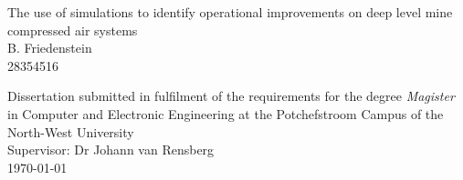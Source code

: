 \documentclass[11.5pt, english, oneside, singlespacing, open=any]{report}
\begin{document}
	
\begin{titlepage}
	\BgThispage	
		\vspace{0cm}
		\begin{center}
			\Huge{The use of simulations to identify operational improvements on deep level mine compressed air systems}\\
			\vspace{4cm}
			\huge{B. Friedenstein \\28354516}\\
		\end{center}
	
	\vspace{2cm}
	
\begin{flushleft}
	{\centering \LARGE Dissertation submitted in fulfilment of the requirements for the degree {\color{blue} \textit{Magister}} in {\color{blue}Computer and Electronic Engineering} at the Potchefstroom Campus of the North-West University\\
	}
	\vspace{3cm}
	{\LARGE \setlength{\parindent}{0.5cm} Supervisor: Dr Johann van Rensberg \\
	\vspace{3cm}
	\LARGE{\monthyeardate\today}\\		
	}
\end{flushleft}
\end{titlepage}
\clearpage
\end{document}
